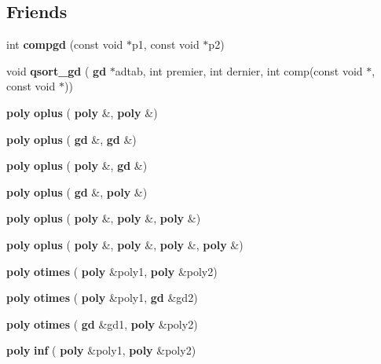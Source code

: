 \subsection*{Friends}
\begin{DoxyCompactItemize}
\item 
\mbox{\label{classmmgd_1_1poly_a902bbbf11a23a3fc4075dcd29e9ba0a3}} 
int {\bfseries compgd} (const void $\ast$p1, const void $\ast$p2)
\item 
\mbox{\label{classmmgd_1_1poly_a6e11338fa76cb7916e75802534f77587}} 
void {\bfseries qsort\+\_\+gd} (\textbf{ gd} $\ast$adtab, int premier, int dernier, int comp(const void $\ast$, const void $\ast$))
\item 
\mbox{\label{classmmgd_1_1poly_abcce92100cdf3208f275859d3908fbe6}} 
\textbf{ poly} {\bfseries oplus} (\textbf{ poly} \&, \textbf{ poly} \&)
\item 
\mbox{\label{classmmgd_1_1poly_a247e64e536c6f1a070bc8eb9d870058d}} 
\textbf{ poly} {\bfseries oplus} (\textbf{ gd} \&, \textbf{ gd} \&)
\item 
\mbox{\label{classmmgd_1_1poly_a8408c8cbe50239231608be92b6c8b47f}} 
\textbf{ poly} {\bfseries oplus} (\textbf{ poly} \&, \textbf{ gd} \&)
\item 
\mbox{\label{classmmgd_1_1poly_a7d137100cfb94e8231c00c253b1c0d45}} 
\textbf{ poly} {\bfseries oplus} (\textbf{ gd} \&, \textbf{ poly} \&)
\item 
\mbox{\label{classmmgd_1_1poly_aa457431adea4b51f375222c772dfa926}} 
\textbf{ poly} {\bfseries oplus} (\textbf{ poly} \&, \textbf{ poly} \&, \textbf{ poly} \&)
\item 
\mbox{\label{classmmgd_1_1poly_a035bd6940202bdaefbd9f15b65aca4c7}} 
\textbf{ poly} {\bfseries oplus} (\textbf{ poly} \&, \textbf{ poly} \&, \textbf{ poly} \&, \textbf{ poly} \&)
\item 
\mbox{\label{classmmgd_1_1poly_adc4c4b3ff5bde03992056d6293de8adc}} 
\textbf{ poly} {\bfseries otimes} (\textbf{ poly} \&poly1, \textbf{ poly} \&poly2)
\item 
\mbox{\label{classmmgd_1_1poly_ab6880d5f38b5617b51b536cc12dbe632}} 
\textbf{ poly} {\bfseries otimes} (\textbf{ poly} \&poly1, \textbf{ gd} \&gd2)
\item 
\mbox{\label{classmmgd_1_1poly_a48427a3900629c5a386cbc2817f16e55}} 
\textbf{ poly} {\bfseries otimes} (\textbf{ gd} \&gd1, \textbf{ poly} \&poly2)
\item 
\mbox{\label{classmmgd_1_1poly_a803937f55e9be138336bd21748fea019}} 
\textbf{ poly} {\bfseries inf} (\textbf{ poly} \&poly1, \textbf{ poly} \&poly2)

\end{DoxyCompactItemize}
